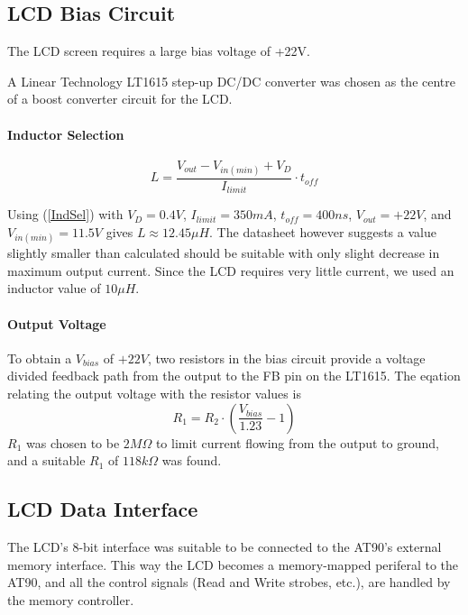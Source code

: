 \subsection{LCD Bias Circuit}

The LCD screen requires a large bias voltage of +22V.

A Linear Technology LT1615 step-up DC/DC converter was chosen as the
centre of a boost converter circuit for the LCD.


\paragraph{Inductor Selection}

\begin{equation}
L=\frac{V_{out}-V_{in(min)}+V_{D}}{I_{limit}}\cdot t_{off}\label{IndSel}\end{equation}


Using (\ref{IndSel}) with $V_{D}=0.4V$, $I_{limit}=350mA$, $t_{off}=400ns$,
$V_{out}=+22V$, and $V_{in(min)}=11.5V$ gives $L\approx12.45\mu{H}$.
The datasheet however suggests a value slightly smaller than calculated
should be suitable with only slight decrease in maximum output current.
Since the LCD requires very little current, we used an inductor value
of $10\mu H$.


\paragraph{Output Voltage}

To obtain a $V_{bias}$ of $+22V$, two resistors in the bias circuit
provide a voltage divided feedback path from the output to the FB
pin on the LT1615. The eqation relating the output voltage with the
resistor values is \begin{equation}
R_{1}=R_{2}\cdot\left(\frac{V_{bias}}{1.23}-1\right)\end{equation}
 $R_{1}$ was chosen to be $2M\Omega$ to limit current flowing from
the output to ground, and a suitable $R_{1}$ of $118k\Omega$ was
found.


\subsection{LCD Data Interface}

The LCD's 8-bit interface was suitable to be connected to the AT90's
external memory interface. This way the LCD becomes a memory-mapped
periferal to the AT90, and all the control signals (Read and Write
strobes, etc.), are handled by the memory controller.

